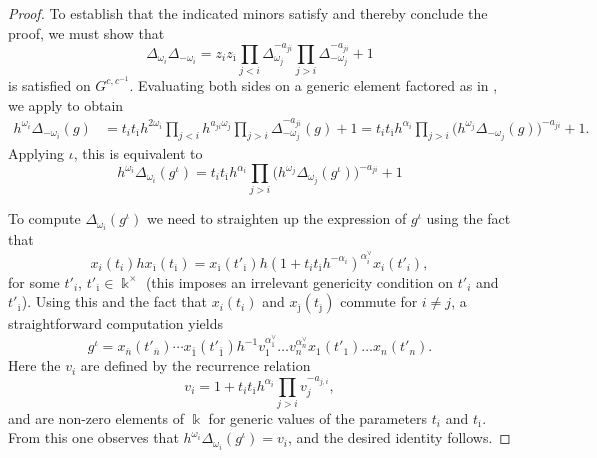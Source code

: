 \documentclass[12pt]{amsart}
\newcommand{\kk}{\Bbbk}
\newcommand{\ol}[1]{\overline{#1}}
\newcommand{\cvar}{z}
\theoremstyle{remark}
\numberwithin{equation}{section}
\numberwithin{figure}{section}
\begin{document}
\begin{proof}
  To establish that the indicated minors satisfy  and thereby conclude the proof, we must show that
  \begin{equation*} 
    \Delta_{\omega_i}\Delta_{-\omega_i} 
    =
    \cvar_i \cvar_{\ol{\imath}}
    \prod_{j<i}\Delta_{\omega_j}^{-a_{ji}}
    \prod_{j>i}\Delta_{-\omega_j}^{-a_{ji}}
    +
    1
  \end{equation*}
  is satisfied on $G^{c,c^{-1}}$.
  Evaluating both sides on a generic element factored as in , we apply  to obtain
  \begin{align*}
    h^{\omega_i}\Delta_{-\omega_i}(g)
    &=
    t_i
    t_{\ol{\imath}}
    h^{2\omega_i}
    \prod_{j<i}h^{a_{j i}\omega_j}
    \prod_{j>i}\Delta_{-\omega_j}^{-a_{ji}}(g)
    +
    1
    = 
    t_i
    t_{\ol{\imath}}
    h^{\alpha_i}
    \prod_{j>i}\Big(h^{\omega_j}\Delta_{-\omega_j}(g)\Big)^{-a_{ji}}
    +
    1.
  \end{align*}
  Applying $\iota$, this is equivalent to  
  \begin{equation*}
    h^{\omega_i}\Delta_{\omega_i}(g^\iota) =
    t_i
    t_{\ol{\imath}}
    h^{\alpha_i}
    \prod_{j>i}\Big(h^{\omega_j}\Delta_{\omega_j}(g^\iota)\Big)^{-a_{ji}}
    +
    1
  \end{equation*}
  
  To compute $\Delta_{\omega_i}(g^\iota)$ we need to straighten up the expression of $g^\iota$ using the fact that
  \begin{equation*}
    x_i(t_i) h x_{\ol{\imath}}(t_{\ol{\imath}})
    =
    x_{\ol{\imath}}(t'_{\ol{\imath}})
    h
    (1+t_it_{\ol{\imath}}h^{-\alpha_i})^{\alpha_i^\vee}
    x_{i}(t'_i),
  \end{equation*}
  for some $t'_i$, $t'_{\ol{\imath}} \in \kk^\times$ \cite[Proposition 7.2]{BZ01} (this imposes an irrelevant genericity condition on $t'_i$ and $t'_{\ol{\imath}}$).
  Using this and the fact that $x_i(t_i)$ and $x_{\ol{\jmath}}(t_{\ol{\jmath}})$ commute for $i \neq j$, a straightforward computation yields
  \[
    g^\iota 
    = 
    x_{\ol{n}}(t'_{\ol{n}})
    \cdots
    x_{\ol{1}}(t'_{\ol{1}})
    h^{-1}
    v_1^{\alpha^\vee_1}
    \dots
    v_n^{\alpha^\vee_n}
    x_1(t'_1)
    \dots
    x_n(t'_n).
  \]
  Here the $v_i$ are defined by the recurrence relation
  \[
    v_i 
    = 
    1 + t_i t_{\ol{\imath}} h^{\alpha_i}
    \prod_{j > i} v_j^{-a_{j,i}},
  \]
  and are non-zero elements of $\kk$ for generic values of the parameters $t_i$ and $t_{\ol{\imath}}$.
  From this one observes that $h^{\omega_i}\Delta_{\omega_i}(g^\iota) = v_i$, and the desired identity follows.
\end{proof}
\end{document}
